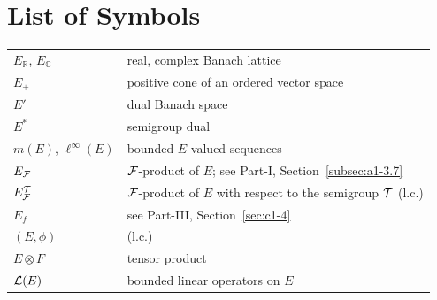 

\chapter*{List of Symbols}
\thispagestyle{empty}
\begin{longtable}{p{}p{}}%
$E_{\mathbb{R}}$, $E_{\mathbb{C}}$ & real, complex Banach lattice \\ %
$E_{+}$ & positive cone of an ordered vector space \\ %
$E'$ & dual Banach space\\ %
$E^{*}$ & semigroup dual \\ %
$m(E)$, $\ell^\infty(E)$  & bounded $E$-valued sequences \\
$E_{\mathcal{F}}$ & $\mathcal{F}$-product of $E$; see Part-I, Section~\ref{subsec:a1-3.7} \\%
$E_{\mathcal{F}}^{\mathcal{T}}$ & $\mathcal{F}$-product of $E$ with respect to the semigroup $\mathcal{T}$ (l.c.) \\ %
$E_f$ & see Part-III, Section~\ref{sec:c1-4}\\%
$(E,\phi)$ &  (l.c.) \\ %
$E \otimes F$ & tensor product \\ %
$\mathcal{L}(E)$ & bounded linear operators on $E$ \\ %

\end{longtable}
